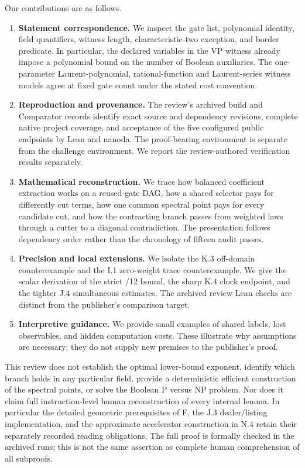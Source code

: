 \documentclass[11pt,letterpaper]{article}
\theoremstyle{definition}\newtheorem{definition}[theorem]{Definition}\newtheorem{example}[theorem]{Example}
\theoremstyle{remark}\newtheorem{remark}[theorem]{Remark}
\begin{document}
Our contributions are as follows.
\begin{enumerate}[leftmargin=1.7em,itemsep=2pt]
\item \textbf{Statement correspondence.} We inspect the gate list, polynomial identity, field quantifiers, witness length, characteristic-two exception, and border predicate. In particular, the declared variables in the VP witness already impose a polynomial bound on the number of Boolean auxiliaries. The one-parameter Laurent-polynomial, rational-function and Laurent-series witness models agree at fixed gate count under the stated cost convention.
\item \textbf{Reproduction and provenance.} The review's archived build and Comparator records identify exact source and dependency revisions, complete native project coverage, and acceptance of the five configured public endpoints by Lean and nanoda. The proof-bearing environment is separate from the challenge environment. We report the review-authored verification results separately.
\item \textbf{Mathematical reconstruction.} We trace how balanced coefficient extraction works on a reused-gate DAG, how a shared selector pays for differently cut terms, how one common spectral point pays for every candidate cut, and how the contracting branch passes from weighted laws through a cutter to a diagonal contradiction. The presentation follows dependency order rather than the chronology of fifteen audit passes.
\item \textbf{Precision and local extensions.} We isolate the K.3 off-domain counterexample and the I.1 zero-weight trace counterexample. We give the scalar derivation of the strict /12 bound, the sharp K.4 clock endpoint, and the tighter J.4 simultaneous estimates. The archived review Lean checks are distinct from the publisher's comparison target.
\item \textbf{Interpretive guidance.} We provide small examples of shared labels, lost observables, and hidden computation costs. These illustrate why assumptions are necessary; they do not supply new premises to the publisher's proof.
\end{enumerate}
This review does not establish the optimal lower-bound exponent, identify which branch holds in any particular field, provide a deterministic efficient construction of the spectral points, or solve the Boolean P versus NP problem. Nor does it claim full instruction-level human reconstruction of every internal lemma. In particular the detailed geometric prerequisites of F, the J.3 dealer/listing implementation, and the approximate accelerator construction in N.4 retain their separately recorded reading obligations. The full proof is formally checked in the archived runs; this is not the same assertion as complete human comprehension of all subproofs.
\end{document}
